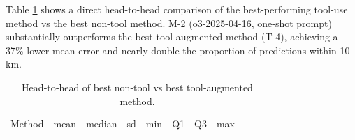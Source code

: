 Table \ref{tbl:best_methods} shows a direct head-to-head comparison of
the best-performing tool-use method vs the best non-tool method. M-2
(o3-2025-04-16, one-shot prompt) substantially outperforms the best
tool-augmented method (T-4), achieving a 37\% lower mean error and
nearly double the proportion of predictions within 10 km.

\begin{longtable}[]{@{}
  >{\raggedright\arraybackslash}p{}
  >{\raggedright\arraybackslash}p{}
  >{\raggedright\arraybackslash}p{}
  >{\raggedright\arraybackslash}p{}
  >{\raggedright\arraybackslash}p{}
  >{\raggedright\arraybackslash}p{}
  >{\raggedright\arraybackslash}p{}
  >{\raggedright\arraybackslash}p{}
  >{\raggedright\arraybackslash}p{}
  >{\raggedright\arraybackslash}p{}
  >{\raggedright\arraybackslash}p{}@{}}
\caption{\label{tbl:best_methods}Head‑to‑head of best non‑tool vs best
tool‑augmented method.}\tabularnewline
\toprule\noalign{}
\begin{minipage}[b]{\linewidth}\raggedright
Method
\end{minipage} & \begin{minipage}[b]{\linewidth}\raggedright
mean
\end{minipage} & \begin{minipage}[b]{\linewidth}\raggedright
median
\end{minipage} & \begin{minipage}[b]{\linewidth}\raggedright
sd
\end{minipage} & \begin{minipage}[b]{\linewidth}\raggedright
min
\end{minipage} & \begin{minipage}[b]{\linewidth}\raggedright
Q1
\end{minipage} & \begin{minipage}[b]{\linewidth}\raggedright
Q3
\end{minipage} & \begin{minipage}[b]{\linewidth}\raggedright
max
\end{minipage} & \begin{minipage}[b]{\linewidth}\raggedright

\end{minipage}
\end{longtable}
